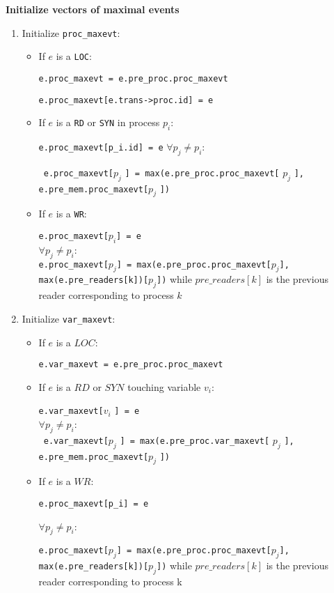 \documentclass{llncs}
\begin{document}
\noindent
\textbf{Initialize vectors of maximal events}
\begin{enumerate}
	\item {Initialize \verb!proc_maxevt!:}
	\begin{itemize}
		\item
		If $e$ is a \verb!LOC!:
		
		\verb!e.proc_maxevt = e.pre_proc.proc_maxevt!
		
		\verb!e.proc_maxevt[e.trans->proc.id] = e!
		
		\item
		If $e$ is a \verb!RD! or \verb!SYN! in process $p_i$: 
		
		\verb!e.proc_maxevt[p_i.id] = e!
		$\forall p_j \neq p_i$: 
		
		\verb! e.proc_maxevt[!$p_j$ \verb!] = max(e.pre_proc.proc_maxevt[! $p_j$ \verb!], e.pre_mem.proc_maxevt[!$p_j$ \verb!])!
		
		\item
		If $e$ is a \verb!WR!: 
		
		\verb!e.proc_maxevt[!$p_i$\verb!] = e! \\
		$\forall p_j \neq p_i$: \\
		\verb!e.proc_maxevt[!$p_j$\verb!] = max(e.pre_proc.proc_maxevt[!$p_j$\verb!], max(e.pre_readers[k])[!$p_j$\verb!])!
		while $pre\_readers[k]$ is the previous reader corresponding to process $k$ 
	\end{itemize}
	
	\item {Initialize \verb!var_maxevt!:}
	\begin{itemize}
		\item
		If $e$ is a $LOC$:
		
		\verb!e.var_maxevt = e.pre_proc.proc_maxevt!
		\item
		If $e$ is a $RD$ or $SYN$ touching variable $v_i$: 
		
		\verb!e.var_maxevt[!$v_i$ \verb!] = e!\\
		$\forall p_j \neq p_i$: \\
		\verb! e.var_maxevt[!$p_j$ \verb!] = max(e.pre_proc.var_maxevt[! $p_j$ \verb!], e.pre_mem.proc_maxevt[!$p_j$ \verb!])!
		
		\item
		If $e$ is a $WR$: 
		
		\verb!e.proc_maxevt[p_i] = e!
		
		$\forall p_j \neq p_i$:
		
		\verb!e.proc_maxevt[!$p_j$\verb!] = max(e.pre_proc.proc_maxevt[!$p_j$\verb!], max(e.pre_readers[k])[!$p_j$\verb!])!
		while $pre\_readers[k]$ is the previous reader corresponding to process k 
	\end{itemize}	
\end{enumerate}
\end{document}
